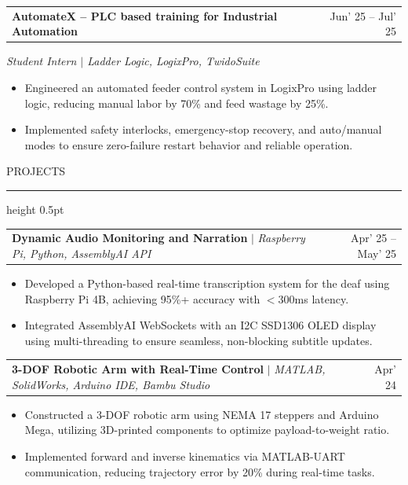 \documentclass[10pt,a4paper]{article}
\newcommand{\resumeheading}[1]{
    \vspace{6pt}
    {\large\color{resblue} #1}
    \vspace{1pt}
    {\color{resblue}\hrule height 0.5pt}
    \vspace{4pt}
}
\begin{document}
\begin{tabularx}{\textwidth}{@{}X r@{}}
\textbf{\color{resblue} AutomateX -- PLC based training for Industrial Automation} & Jun' 25 -- Jul' 25
\end{tabularx}
\textit{Student Intern $|$ Ladder Logic, LogixPro, TwidoSuite}
\begin{itemize}[leftmargin=1.5em, itemsep=0pt, parsep=1pt, topsep=2pt]
    \item Engineered an automated feeder control system in LogixPro using ladder logic, reducing manual labor by 70\% and feed wastage by 25\%.
    \item Implemented safety interlocks, emergency-stop recovery, and auto/manual modes to ensure zero-failure restart behavior and reliable operation.
\end{itemize}

\resumeheading{PROJECTS}

\begin{tabularx}{\textwidth}{@{}X r@{}}
\textbf{\color{resblue} Dynamic Audio Monitoring and Narration} $|$ \textit{Raspberry Pi, Python, AssemblyAI API} & Apr' 25 -- May' 25
\end{tabularx}
\begin{itemize}[leftmargin=1.5em, itemsep=0pt, parsep=1pt, topsep=2pt]
    \item Developed a Python-based real-time transcription system for the deaf using Raspberry Pi 4B, achieving 95\%+ accuracy with $<$300ms latency.
    \item Integrated AssemblyAI WebSockets with an I2C SSD1306 OLED display using multi-threading to ensure seamless, non-blocking subtitle updates.
\end{itemize}

\vspace{2pt}

\begin{tabularx}{\textwidth}{@{}X r@{}}
\textbf{\color{resblue} 3-DOF Robotic Arm with Real-Time Control} $|$ \textit{MATLAB, SolidWorks, Arduino IDE, Bambu Studio} & Apr' 24
\end{tabularx}
\begin{itemize}[leftmargin=1.5em, itemsep=0pt, parsep=1pt, topsep=2pt]
    \item Constructed a 3-DOF robotic arm using NEMA 17 steppers and Arduino Mega, utilizing 3D-printed components to optimize payload-to-weight ratio.
    \item Implemented forward and inverse kinematics via MATLAB-UART communication, reducing trajectory error by 20\% during real-time tasks.
\end{itemize}
\end{document}
